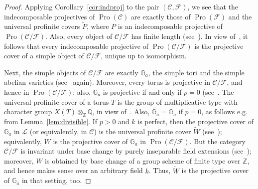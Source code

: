\documentclass[11pt]{article}
\theoremstyle{definition}
\numberwithin{equation}{section}
\newcommand\bG{{\mathbb G}}
\newcommand\bQ{{\mathbb Q}}
\newcommand\bZ{{\mathbb Z}}
\newcommand\cC{{\mathcal C}}
\newcommand\cF{{\mathcal F}}
\newcommand\cL{{\mathcal L}}
\newcommand\tP{{\widetilde P}}
\newcommand\tW{{\widetilde W}}
\DeclareMathOperator{\Pro}{Pro}
\theoremstyle{remark}
\begin{document}
\begin{proof}
Applying Corollary~\ref{cor:indproj} to the pair $(\cC,\cF)$, we see that the indecomposable projectives of $\Pro(\cC)$ are exactly those of $\Pro(\cF)$ and the universal profinite covers $\tP$, where $P$ is an indecomposable projective of $\Pro(\cC/\cF)$. Also, every object of $\cC/\cF$ has finite length (see~\cite[Prop.~3.2]{Br17a}). In view of~\cite[V.2.4.6]{DG}, it follows that every indecomposable projective of $\Pro(\cC/\cF)$ is the projective cover of a simple object of $\cC/\cF$, unique up to isomorphism.

Next, the simple objects of $\cC/\cF$ are exactly $\bG_a$, the simple tori and the simple abelian varieties (see~\cite[Prop.~3.2]{Br17a} again). Moreover, every torus is projective in $\cC/\cF$, and hence in $\Pro(\cC/\cF)$; also, $\bG_a$ is projective if and only if $p = 0$ (see~\cite[Thm.~5.14]{Br17a}. The universal profinite cover of a torus $T$ is the group of multiplicative type with character group $X(T) \otimes_{\bZ} \bQ$, in view of~\cite[V.3.5.2]{DG}. Also, $\widetilde{\bG_a} = \bG_a$ if $p = 0$, as follows e.g. from Lemma~\ref{lem:divisible}. If $p > 0$ and $k$ is perfect, then the projective cover of $\bG_a$ in $\cL$ (or equivalently, in $\cC$) is the universal profinite cover $\tW$ (see~\cite[V.3.7.5]{DG}); equivalently, $W$ is the projective cover of $\bG_a$ in $\Pro(\cC/\cF)$. But the category $\cC/\cF$ is invariant under base change by purely inseparable field extensions (see~\cite[Thm.~3.11]{Br17a}); moreover, $W$ is obtained by base change of a group scheme of finite type over $\bZ$, and hence makes sense over an arbitrary field $k$. Thus, $\tW$ is the projective cover of $\bG_a$ in that setting, too.
\end{proof}
\end{document}
